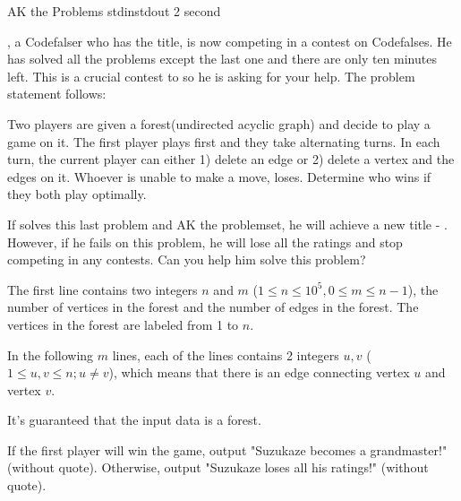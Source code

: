 
\begin{problem}{AK the Problems}
{stdin}{stdout}
{2 second}{}{}

\Suzukaze, a Codefalser who has the \master title, is now competing in a contest on Codefalses. He has solved all the problems except the last one and there are only ten minutes left. This is a crucial contest to \Suzukaze so he is asking for your help. The problem statement follows:

\par
Two players are given a forest(undirected acyclic graph) and decide to play a game on it. The first player plays first and they take alternating turns. In each turn, the current player can either 1) delete an edge or 2) delete a vertex and the edges on it. Whoever is unable to make a move, loses. Determine who wins if they both play optimally.

\par
If \Suzukaze  solves this last problem and AK the problemset, he will achieve a new title - \grandmaster. However, if he fails on this problem, he will lose all the ratings and stop competing in any contests. Can you help him solve this problem?

\InputFile

The first line contains two integers $n$ and $m$ ($1 \le n \le 10^5,0 \le m \le n-1 $), the number of vertices in the forest and the number of edges in the forest. The vertices in the forest are labeled from 1 to $n$.

In the following $m$ lines, each of the lines contains 2 integers $u, v$ ($1 \le u,v \le n; u \neq v$), which means that there is an edge connecting vertex $u$ and vertex $v$.

It's guaranteed that the input data is a forest.

\OutputFile

If the first player will win the game, output "Suzukaze becomes a grandmaster!" (without quote). Otherwise, output "Suzukaze loses all his ratings!" (without quote).

\Examples

\begin{example}
%
\end{example}

\end{problem}

